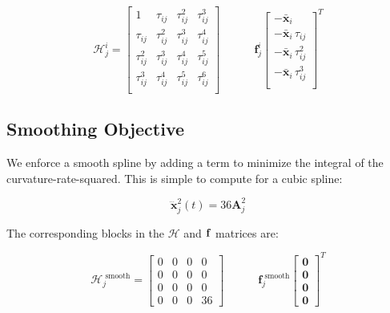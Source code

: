\begin{equation}
  \mathcal{H}_j^i
  =
  \begin{bmatrix}
    1 & \tau_{ij} & \tau_{ij}^2 & \tau_{ij}^3 \\
    \tau_{ij} & \tau_{ij}^2 & \tau_{ij}^3  & \tau_{ij}^4\\
    \tau_{ij}^2 & \tau_{ij}^3  & \tau_{ij}^4 & \tau_{ij}^5\\
    \tau_{ij}^3  & \tau_{ij}^4 & \tau_{ij}^5& \tau_{ij}^6\\
  \end{bmatrix}

  \quad \quad \quad

  \bm{f}_j^i
  \begin{bmatrix}
    -\bar{\bm{x}}_i \\
    -\bar{\bm{x}}_i \, \tau_{ij}\\
    -\bar{\bm{x}}_i \, \tau_{ij}^2\\
    -\bar{\bm{x}}_i \, \tau_{ij}^3\\
  \end{bmatrix}^T

\end{equation}


\subsection{Smoothing Objective}

We enforce a smooth spline by adding a term to minimize the integral of the curvature-rate-squared.
This is simple to compute for a cubic spline:

\begin{equation}
  \dddot{\bm{x}}_j^2(t) = 36\bm{A}_j^2
\end{equation}

The corresponding blocks in the $\mathcal{H}$ and $\bf{f}$ matrices are:

\begin{equation}
  \mathcal{H}_j^\text{ smooth}
  =
  \begin{bmatrix}
    0 & 0 & 0 & 0 \\
    0 & 0 & 0 & 0 \\
    0 & 0 & 0 & 0 \\
    0 & 0 & 0 & 36
  \end{bmatrix}

  \quad \quad \quad

  \bm{f}_j^\text{ smooth}
  \begin{bmatrix}
    \bm{0} \\
    \bm{0} \\
    \bm{0} \\
    \bm{0}
  \end{bmatrix}^T

\end{equation}
